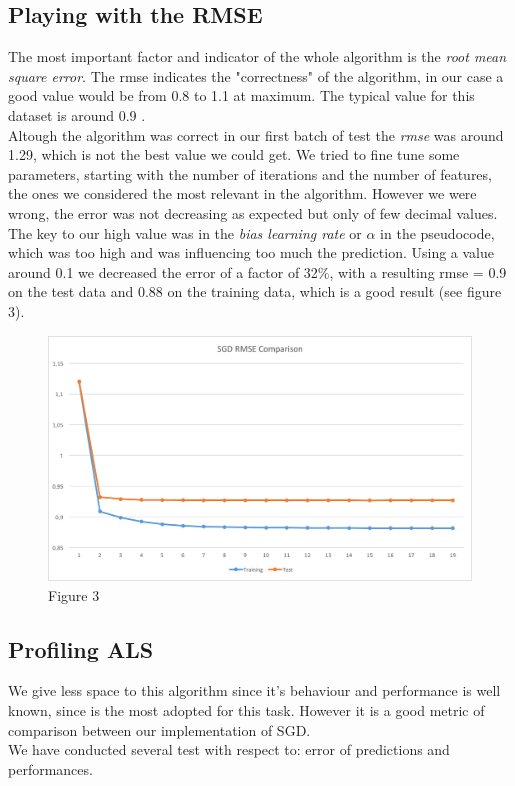 \documentclass{sig-alternate-05-2015}
\begin{document}
\subsection{Playing with the RMSE}
The most important factor and indicator of the whole algorithm is the \textit{root mean
square error}. The rmse indicates the "correctness" of the algorithm, in our case
a good value would be from 0.8 to 1.1 at maximum. The typical value for this dataset
is around 0.9 \cite{mymedialite}.\\
Altough the algorithm was correct in our first batch of test the \textit{rmse} was
around 1.29, which is not the best value we could get. We tried to fine tune some
parameters, starting with the number of iterations and the number of features, the ones
we considered the most relevant in the algorithm. However we were wrong, the
error was not decreasing as expected but only of few decimal values.
The key to our high value was in the \textit{bias learning rate} or $\alpha$ in the pseudocode,
which was too high and was influencing too much the prediction. Using a value around 0.1 we decreased
the error of a factor of 32$\%$, with a resulting rmse = 0.9 on the test data and 0.88 on the training data,
which is a good result (see figure 3).
\begin{figure}
    \caption{Figure 3}
    \centering
    \includegraphics[scale=0.4]{sgdrmseserial.png}
\end{figure}

\subsection{Profiling ALS}

We give less space to this algorithm since it's behaviour and performance
is well known, since is the most adopted for this task. However it is
a good metric of comparison between our implementation of SGD.\\
We have conducted several test with respect to: error of predictions and performances.
\end{document}
